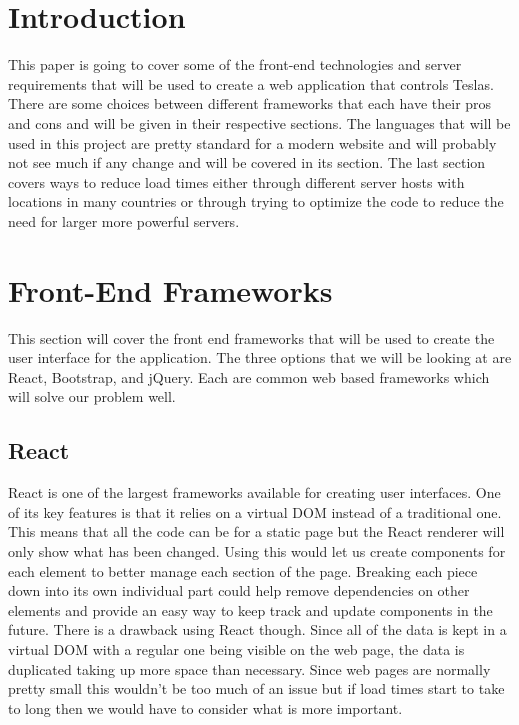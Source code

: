 \documentclass[onecolumn, draftclsnofoot,10pt, compsoc]{IEEEtran}
\begin{document}
\section{Introduction}
This paper is going to cover some of the front-end technologies and server requirements that will be used to create a web application that controls Teslas.
There are some choices between different frameworks that each have their pros and cons and will be given in their respective sections. 
The languages that will be used in this project are pretty standard for a modern website and will probably not see much if any change and will be covered in its section.  The last section covers ways to reduce load times either through different server hosts with locations in many countries or through trying to optimize the code to reduce the need for larger more powerful servers.

\section{Front-End Frameworks}
This section will cover the front end frameworks that will be used to create the user interface for the application.
The three options that we will be looking at are React, Bootstrap, and jQuery.
Each are common web based frameworks which will solve our problem well.
\subsection{React}
React is one of the largest frameworks available for creating user interfaces. \cite{1}
One of its key features is that it relies on a virtual DOM instead of a traditional one. \cite{1} 
This means that all the code can be for a static page but the React renderer will only show what has been changed.
Using this would let us create components for each element to better manage each section of the page.
Breaking each piece down into its own individual part could help remove dependencies on other elements and provide an easy way to keep track and update components in the future.
There is a drawback using React though.
Since all of the data is kept in a virtual DOM with a regular one being visible on the web page, the data is duplicated taking up more space than necessary. \cite{2}
Since web pages are normally pretty small this wouldn't be too much of an issue but if load times start to take to long then we would have to consider what is more important.
\end{document}
